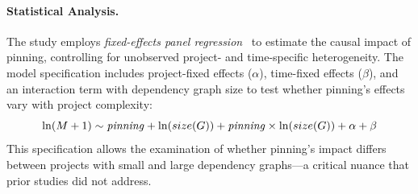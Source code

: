 \paragraph{Statistical Analysis.}
The study employs \emph{fixed-effects panel regression}~\cite{bruderl2015fixed} to estimate the causal impact of pinning, controlling for unobserved project- and time-specific heterogeneity.
The model specification includes project-fixed effects ($\alpha$), time-fixed effects ($\beta$), and an interaction term with dependency graph size to test whether pinning's effects vary with project complexity:
\begin{equation}
\ln(M+1) \sim \text{\emph{pinning}} + \ln(size(G)) + \text{\emph{pinning}} \times \ln(size(G)) + \alpha + \beta
\end{equation}
This specification allows the examination of whether pinning's impact differs between projects with small and large dependency graphs---a critical nuance that prior studies did not address.

